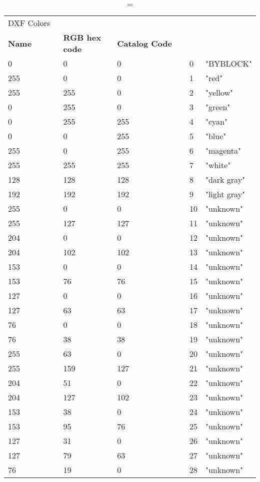 
\begin{longtable}{p{0.3\linewidth} p{0.3\linewidth} p{0.4\linewidth}}
\caption = {DXF Colors}
\label{tblr:dxf}\\
\textbf{Name} & \textbf{RGB hex code} & \textbf{Catalog Code} \\
  0 &    0 &    0 &    0 &  "BYBLOCK"\\
255 &    0 &    0 &    1 &  "red"\\
255 &  255 &    0 &    2 &  "yellow"\\
  0 &  255 &    0 &    3 &  "green"\\
  0 &  255 &  255 &    4 &  "cyan"\\
  0 &    0 &  255 &    5 &  "blue"\\
255 &    0 &  255 &    6 &  "magenta"\\
255 &  255 &  255 &    7 &  "white"\\
128 &  128 &  128 &    8 &  "dark gray"\\
192 &  192 &  192 &    9 &  "light gray"\\
255 &    0 &    0 &   10 &  "unknown"\\
255 &  127 &  127 &   11 &  "unknown"\\
204 &    0 &    0 &   12 &  "unknown"\\
204 &  102 &  102 &   13 &  "unknown"\\
153 &    0 &    0 &   14 &  "unknown"\\
153 &   76 &   76 &   15 &  "unknown"\\
127 &    0 &    0 &   16 &  "unknown"\\
127 &   63 &   63 &   17 &  "unknown"\\
 76 &    0 &    0 &   18 &  "unknown"\\
 76 &   38 &   38 &   19 &  "unknown"\\
255 &   63 &    0 &   20 &  "unknown"\\
255 &  159 &  127 &   21 &  "unknown"\\
204 &   51 &    0 &   22 &  "unknown"\\
204 &  127 &  102 &   23 &  "unknown"\\
153 &   38 &    0 &   24 &  "unknown"\\
153 &   95 &   76 &   25 &  "unknown"\\
127 &   31 &    0 &   26 &  "unknown"\\
127 &   79 &   63 &   27 &  "unknown"\\
 76 &   19 &    0 &   28 &  "unknown"\\

\end{longtable}
